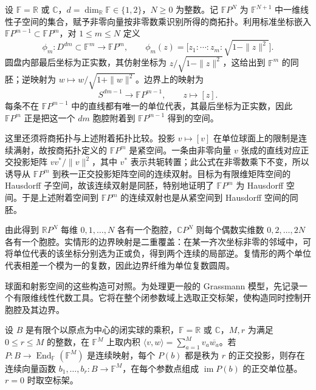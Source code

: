 \begin{example}
	\label{g2:exm:projective-cw}
	设 \(\mathbb F=\mathbb R\) 或 \(\mathbb C\)，\(d=\dim_{\mathbb R}\mathbb F\in\{1,2\}\)，\(N\geq0\) 为整数。记 \(\mathbb FP^N\) 为 \(\mathbb F^{N+1}\) 中一维线性子空间的集合，赋予非零向量按非零数乘识别所得的商拓扑。利用标准坐标嵌入 \(\mathbb FP^{m-1}\subset\mathbb FP^m\)，对 \(1\leq m\leq N\) 定义
	\[
		\phi_m:D^{dm}\subset\mathbb F^m\longrightarrow\mathbb FP^m,
		\qquad
		\phi_m(z)=\bigl[z_1:\cdots:z_m:\sqrt{1-\|z\|^2}\bigr].
	\]
	圆盘内部最后坐标为正实数，其仿射坐标为 \(z/\sqrt{1-\|z\|^2}\)，这给出到 \(\mathbb F^m\) 的同胚；逆映射为 \(w\mapsto w/\sqrt{1+\|w\|^2}\)。边界上的映射为
	\[
		S^{dm-1}\longrightarrow\mathbb FP^{m-1},\qquad z\longmapsto[z].
	\]
	每条不在 \(\mathbb FP^{m-1}\) 中的直线都有唯一的单位代表，其最后坐标为正实数，因此 \(\mathbb FP^m\) 正是把这一个 \(dm\) 胞腔附着到 \(\mathbb FP^{m-1}\) 得到的空间。

	这里还须将商拓扑与上述附着拓扑比较。投影 \(v\mapsto[v]\) 在单位球面上的限制是连续满射，故按商拓扑定义的 \(\mathbb FP^m\) 是紧空间。一条由非零向量 \(v\) 张成的直线对应正交投影矩阵 \(vv^*/\|v\|^2\)，其中 \(v^*\) 表示共轭转置；此公式在非零数乘下不变，所以诱导从 \(\mathbb FP^m\) 到秩一正交投影矩阵空间的连续双射。目标为有限维矩阵空间的 Hausdorff 子空间，故该连续双射是同胚，特别地证明了 \(\mathbb FP^m\) 为 Hausdorff 空间。于是上述附着空间到 \(\mathbb FP^m\) 的连续双射也是从紧空间到 Hausdorff 空间的同胚。

	由此得到 \(\mathbb RP^N\) 每维 \(0,1,\ldots,N\) 各有一个胞腔，\(\mathbb CP^N\) 则每个偶数实维数 \(0,2,\ldots,2N\) 各有一个胞腔。实情形的边界映射是二重覆盖：在某一齐次坐标非零的邻域中，可将单位代表的该坐标分别选为正或负，得到两个连续的局部逆。复情形的两个单位代表相差一个模为一的复数，因此边界纤维为单位复数圆周。
\end{example}

球面和射影空间的这些构造可对照\cite[第0章]{Hatcher2002}。为处理更一般的 Grassmann 模型，先记录一个有限维线性代数工具。它将在整个闭参数域上选取正交标架，使构造同时控制开胞腔及其边界。

\begin{lemma}
	\label{g2:lem:projection-frame-disk}
	设 \(B\) 是有限个以原点为中心的闭实球的乘积，\(\mathbb F=\mathbb R\) 或 \(\mathbb C\)，\(M,r\) 为满足 \(0\leq r\leq M\) 的整数，在 \(\mathbb F^M\) 上取内积 \(\langle v,w\rangle=\sum_{a=1}^M v_a\overline{w_a}\)。若 \(P:B\to\operatorname{End}_{\mathbb F}(\mathbb F^M)\) 是连续映射，每个 \(P(b)\) 都是秩为 \(r\) 的正交投影，则存在连续向量函数 \(b_1,\ldots,b_r:B\to\mathbb F^M\)，在每个参数点组成 \(\operatorname{im}P(b)\) 的正交单位基。\(r=0\) 时取空标架。
\end{lemma}

